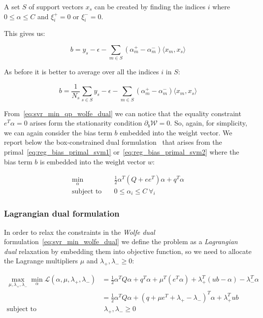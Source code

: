A set $S$ of support vectors $x_s$ can be created by finding the indices $i$ where $0\leq\alpha\leq C$ and $\xi_i^+=0$ or $\xi_i^-=0$.

This gives us:

\begin{equation} \label{eq:svr_b}
    b=y_s-\epsilon-\sum_{m\in S}(\alpha_m^+ -\alpha_m^-) \langle x_m, x_s \rangle
\end{equation}

As before it is better to average over all the indices $i$ in $S$:

\begin{equation} \label{eq:svr_b_avg}
    b=\frac{1}{N_s}\sum_{s\in S}y_s-\epsilon-\sum_{m \in S}(\alpha_m^+ - \alpha_m^-)\langle x_m, x_s \rangle
\end{equation}

From~\eqref{eq:svr_min_qp_wolfe_dual} we can notice that the equality constraint $e^T \alpha = 0$ arises form the stationarity condition $\partial_{{b}} \mathcal{W}=0$. So, again, for simplicity, we can again consider the bias term $b$ embedded into the weight vector. We report below the box-constrained dual formulation~\cite{hsu2002simple} that arises from the primal~\eqref{eq:reg_bias_primal_svm1} or~\eqref{eq:reg_bias_primal_svm2} where the bias term $b$ is embedded into the weight vector $w$:

\begin{equation} \label{eq:svr_min_bcqp_wolf_dual}
    \begin{aligned}
        \min_{\alpha} \quad & \frac{1}{2} \alpha^T (Q + ee^T)\alpha+q^T\alpha \\
            \text{subject to} \quad & 0\leq\alpha_i\leq C \ \forall_i
    \end{aligned}
\end{equation}

\subsubsection{Lagrangian dual formulation}

In order to relax the constraints in the \emph{Wolfe dual} formulation~\eqref{eq:svr_min_wolfe_dual} we define the problem as a \emph{Lagrangian dual} relaxation by embedding them into objective function, so we need to allocate the Lagrange multipliers $\mu$ and $\lambda_+, \lambda_- \geq 0$:

\begin{equation} \label{eq:l1_svr_lagrangian_dual}
	\begin{aligned}
		    \max_{\mu,\lambda_+,\lambda_-} \min_{\alpha} \mathcal{L}(\alpha,\mu,\lambda_+,\lambda_-) &= \frac{1}{2} \alpha^T Q\alpha+q^T\alpha + \mu^T (e^T \alpha) + \lambda_+^T (ub - \alpha) - \lambda_-^T \alpha \\
    &= \frac{1}{2} \alpha^T Q\alpha + (q + \mu e^T + \lambda_+ - \lambda_-)^T \alpha + \lambda_+^T ub \\
    \text{subject to} \quad & \,\, \lambda_+, \lambda_- \geq 0
	\end{aligned}
\end{equation}


